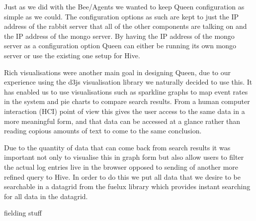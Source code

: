 Just as we did with the Bee/Agents we wanted to keep Queen configuration as
simple as we could. The configuration options as such are kept to just the IP
address of the rabbit server that all of the other components are talking on and
the IP address of the mongo server. By having the IP address of the mongo server
as a configuration option Queen can either be running its own mongo server or
use the existing one setup for Hive.

Rich visualisations were another main goal in designing Queen, due to our
experience using the d3js visualisation library we naturally decided to use
this. It has enabled us to use visualisations such as sparkline graphs to map
event rates in the system and pie charts to compare search results. From a
human computer interaction (HCI) point of view this gives the user access to the
same data in a more meaningful form, and that data can be accessed at a glance
rather than reading copious amounts of text to come to the same conclusion.

Due to the quantity of data that can come back from search results it was
important not only to visualise this in graph form but also allow users to
filter the actual log entries live in the browser opposed to sending of another
more refined query to Hive. In order to do this we put all data that we desire
to be searchable in a datagrid from the fuelux library which provides instant
searching for all data in the datagrid.

fielding stuff
